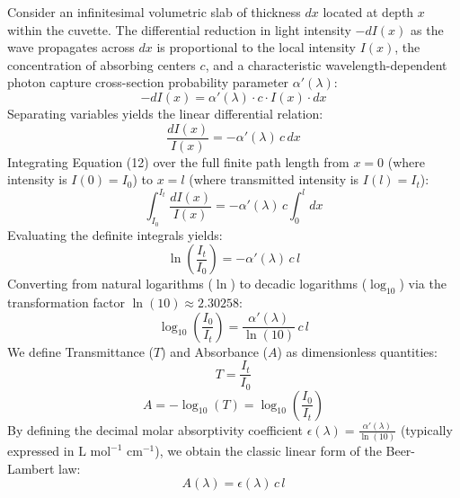 \documentclass[12pt]{article}
\begin{document}
Consider an infinitesimal volumetric slab of thickness $dx$ located at depth $x$ within the cuvette. The differential reduction in light intensity $-dI(x)$ as the wave propagates across $dx$ is proportional to the local intensity $I(x)$, the concentration of absorbing centers $c$, and a characteristic wavelength-dependent photon capture cross-section probability parameter $\alpha'(\lambda)$:
\begin{equation}
-dI(x) = \alpha'(\lambda) \cdot c \cdot I(x) \cdot dx
\end{equation}
Separating variables yields the linear differential relation:
\begin{equation}
\frac{dI(x)}{I(x)} = -\alpha'(\lambda) \, c \, dx
\end{equation}
Integrating Equation (12) over the full finite path length from $x = 0$ (where intensity is $I(0) = I_0$) to $x = l$ (where transmitted intensity is $I(l) = I_t$):
\begin{equation}
\int_{I_0}^{I_t} \frac{dI(x)}{I(x)} = -\alpha'(\lambda) \, c \int_{0}^{l} dx
\end{equation}
Evaluating the definite integrals yields:
\begin{equation}
\ln\left(\frac{I_t}{I_0}\right) = -\alpha'(\lambda) \, c \, l
\end{equation}
Converting from natural logarithms ($\ln$) to decadic logarithms ($\log_{10}$) via the transformation factor $\ln(10) \approx 2.30258$:
\begin{equation}
\log_{10}\left(\frac{I_0}{I_t}\right) = \frac{\alpha'(\lambda)}{\ln(10)} \, c \, l
\end{equation}
We define Transmittance ($T$) and Absorbance ($A$) as dimensionless quantities:
\begin{equation}
T = \frac{I_t}{I_0}
\end{equation}
\begin{equation}
A = -\log_{10}(T) = \log_{10}\left(\frac{I_0}{I_t}\right)
\end{equation}
By defining the decimal molar absorptivity coefficient $\epsilon(\lambda) = \frac{\alpha'(\lambda)}{\ln(10)}$ (typically expressed in $\text{L mol}^{-1} \text{ cm}^{-1}$), we obtain the classic linear form of the Beer-Lambert law:
\begin{equation}
A(\lambda) = \epsilon(\lambda) \, c \, l
\end{equation}
\end{document}
